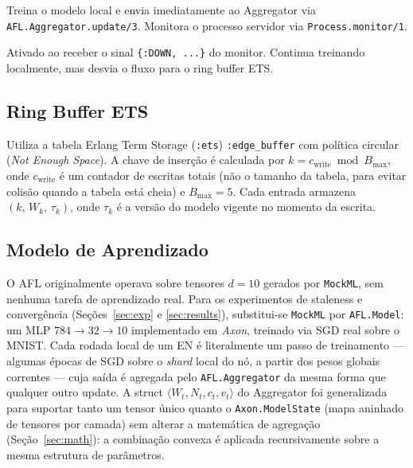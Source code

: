\documentclass[conference,a4paper]{IEEEtran}
\begin{document}
\begin{description}[leftmargin=*,noitemsep]
  \item[\textbf{:connected}] Treina o modelo local e envia imediatamente ao
    Aggregator via \texttt{AFL.Aggregator.update/3}. Monitora o processo
    servidor via \texttt{Process.monitor/1}.
  \item[\textbf{:disconnected}] Ativado ao receber o sinal \texttt{\{:DOWN,
    ...\}} do monitor. Continua treinando localmente, mas desvia o fluxo
    para o ring buffer ETS.
\end{description}

\subsection{Ring Buffer ETS}

Utiliza a tabela Erlang Term Storage (\texttt{:ets}) \texttt{:edge\_buffer}
com política circular (\textit{Not Enough Space}). A chave de inserção é
calculada por $k = c_{\text{write}} \bmod B_{\max}$, onde $c_{\text{write}}$
é um contador de escritas totais (não o tamanho da tabela, para evitar
colisão quando a tabela está cheia) e $B_{\max} = 5$. Cada entrada armazena
$(k,\, W_k,\, \tau_k)$, onde $\tau_k$ é a versão do modelo vigente no
momento da escrita.

\subsection{Modelo de Aprendizado}

O AFL originalmente operava sobre tensores $d=10$ gerados por
\texttt{MockML}, sem nenhuma tarefa de aprendizado real. Para os experimentos
de staleness e convergência (Seções~\ref{sec:exp} e \ref{sec:results}),
substitui-se \texttt{MockML} por \texttt{AFL.Model}: um MLP
$784\!\to\!32\!\to\!10$ implementado em \textit{Axon}, treinado via SGD real
sobre o MNIST. Cada rodada local de um EN é literalmente um passo de
treinamento --- algumas épocas de SGD sobre o \textit{shard} local do nó, a
partir dos pesos globais correntes --- cuja saída é agregada pelo
\texttt{AFL.Aggregator} da mesma forma que qualquer outro update. A struct
$\langle W_t, N_t, c_t, v_t \rangle$ do Aggregator foi generalizada para
suportar tanto um tensor único quanto o \texttt{Axon.ModelState} (mapa
aninhado de tensores por camada) sem alterar a matemática de agregação
(Seção~\ref{sec:math}): a combinação convexa é aplicada recursivamente sobre
a mesma estrutura de parâmetros.
\end{document}
